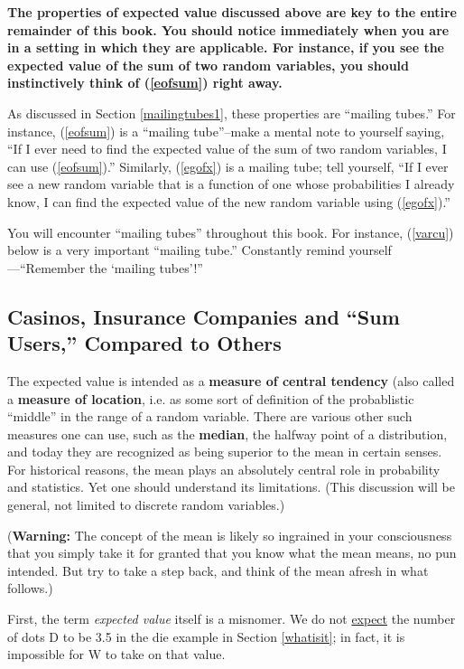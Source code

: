 {\bf The properties of expected value discussed above are key to the
entire remainder of this book.  You should notice immediately when you
are in a setting in which they are applicable.  For instance, if you see
the expected value of the sum of two random variables, you should
instinctively think of (\ref{eofsum}) right away.}  

As discussed in Section \ref{mailingtubes1}, these properties are
``mailing tubes.'' For instance, (\ref{eofsum}) is a ``mailing
tube''--make a mental note to yourself saying, ``If I ever need to find
the expected value of the sum of two random variables, I can use
(\ref{eofsum}).''  Similarly, (\ref{egofx}) is a mailing tube;
tell yourself, ``If I ever see a new random variable that is a function
of one whose probabilities I already know, I can find the expected value
of the new random variable using (\ref{egofx}).''

You will encounter ``mailing tubes'' throughout this book.  For
instance, (\ref{varcu}) below is a very important ``mailing tube.''
Constantly remind yourself---``Remember the `mailing tubes'!''

\subsection{Casinos, Insurance Companies and ``Sum Users,'' Compared
to Others}

The expected value is intended as a {\bf measure of central tendency}
(also called a {\bf measure of location}, i.e.  as some sort of
definition of the probablistic ``middle'' in the range of a random
variable.  There are various other such measures one can use, such as
the {\bf median}, the halfway point of a distribution, and today they
are recognized as being superior to the mean in certain senses.  For
historical reasons, the mean plays an absolutely central role in
probability and statistics.  Yet one should understand its limitations.
(This discussion will be general, not limited to discrete random
variables.)

({\bf Warning:}  The concept of the mean is likely so ingrained in your
consciousness that you simply take it for granted that you know what the
mean means, no pun intended.  But try to take a step back, and think of
the mean afresh in what follows.)

First, the term {\it expected value} itself is a misnomer.  We do not
\underline{expect} the number of dots D to be 3.5 in the die example in
Section \ref{whatisit}; in fact, it is impossible for W to take on that
value.  


